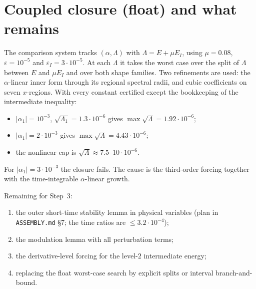 \documentclass[11pt]{amsart}
\theoremstyle{remark}
\newcommand{\eps}{\varepsilon}
\begin{document}
\section{Coupled closure (float) and what remains}
The comparison system tracks $(\alpha,\Lambda)$ with $\Lambda=E+\mu E_I$, using $\mu=0.08$, $\eps=10^{-5}$ and $\eps_I=3\cdot10^{-5}$. At each $\Lambda$ it takes the worst case over the split of $\Lambda$ between $E$ and $\mu E_I$ and over both shape families. Two refinements are used: the $\alpha$-linear inner form through its regional spectral radii, and cubic coefficients on seven $x$-regions. With every constant certified except the bookkeeping of the intermediate inequality:
\begin{itemize}
\item $|\alpha_1|=10^{-3}$, $\sqrt{\Lambda_1}=1.3\cdot10^{-6}$ gives $\max\sqrt\Lambda=1.92\cdot10^{-6}$;
\item $|\alpha_1|=2\cdot10^{-3}$ gives $\max\sqrt\Lambda=4.43\cdot10^{-6}$;
\item the nonlinear cap is $\sqrt\Lambda\approx7.5$--$10\cdot10^{-6}$.
\end{itemize}
For $|\alpha_1|=3\cdot10^{-3}$ the closure fails. The cause is the third-order forcing together with the time-integrable $\alpha$-linear growth.

Remaining for Step~3:
\begin{enumerate}
\item the outer short-time stability lemma in physical variables (plan in \texttt{ASSEMBLY.md} \S7; the time ratios are $\le3.2\cdot10^{-4}$);
\item the modulation lemma with all perturbation terms;
\item the derivative-level forcing for the level-$2$ intermediate energy;
\item replacing the float worst-case search by explicit splits or interval branch-and-bound.
\end{enumerate}
\end{document}
